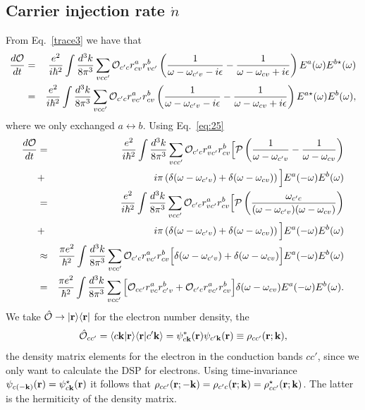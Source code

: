 \documentclass[floatfix,prb,aps,superscriptaddress,11pt]{revtex4}
\begin{document}
\subsection{Carrier injection rate $\dot n$}\label{sec:cir}
From Eq.~\eqref{trace3} we have that
\begin{eqnarray}\label{trace42}
\frac{d{\cal O}}{dt}
&=&
\frac{e^2}{i\hbar^2}
\int\frac{d^3k}{8\pi^3}
\sum_{vcc'}
{\cal O}_{c'c}r^a_{cv}r^b_{vc'}
\left(
\frac{1}{\omega-\omega_{c'v}-i\epsilon}
-
\frac{1}
{\omega-\omega_{cv}+i\epsilon}
\right)
E^a(\omega)E^{b\star}(\omega)
\\ \nonumber
&=&
\frac{e^2}{i\hbar^2}
\int\frac{d^3k}{8\pi^3}
\sum_{vcc'}
{\cal O}_{c'c}r^a_{vc'} r^b_{cv}
\left(
\frac{1}{\omega-\omega_{c'v}-i\epsilon}
-
\frac{1}
{\omega-\omega_{cv}+i\epsilon}
\right) 
E^{a\star}(\omega) E^b(\omega)
,
\end{eqnarray}  
where we only exchanged $a\leftrightarrow b$. Using Eq.~\eqref{eq:25}
\begin{eqnarray}\label{trace54}
\frac{d{\cal O}}{dt}
&=&
\frac{e^2}{i\hbar^2}
\int\frac{d^3k}{8\pi^3}
\sum_{vcc'}
{\cal O}_{c'c}r^a_{vc'} r^b_{cv}
\Big[
{\cal P}\left(
\frac{1}{\omega-\omega_{c'v}}
-
\frac{1}
{\omega-\omega_{cv}}
\right) 
\nonumber\\
&+&
i\pi\left(
\delta(\omega-\omega_{c'v})
+
\delta(\omega-\omega_{cv})
\right)
\Big]
E^a(-\omega) E^b(\omega)
\nonumber\\
&=&
\frac{e^2}{i\hbar^2}
\int\frac{d^3k}{8\pi^3}
\sum_{vcc'}
{\cal O}_{c'c}r^a_{vc'} r^b_{cv}
\Big[
{\cal P}\left(
\frac{\omega_{c'c}}{(\omega-\omega_{c'v})
(\omega-\omega_{cv})}
\right) 
\nonumber\\
&+&
i\pi\left(
\delta(\omega-\omega_{c'v})
+
\delta(\omega-\omega_{cv})
\right)
\Big]
E^a(-\omega) E^b(\omega)
\nonumber\\
&\approx&
\frac{\pi e^2}{\hbar^2}
\int\frac{d^3k}{8\pi^3}
\sum_{vcc'}
{\cal O}_{c'c}r^a_{vc'} r^b_{cv}
\Big[
\delta(\omega-\omega_{c'v})
+
\delta(\omega-\omega_{cv})
\Big]
E^a(-\omega) E^b(\omega)
\nonumber\\
&=&
\frac{\pi e^2}{\hbar^2}
\int\frac{d^3k}{8\pi^3}
\sum_{vcc'}
\Big[
{\cal O}_{cc'}r^a_{vc} r^b_{c'v}
+
{\cal O}_{c'c}r^a_{vc'} r^b_{cv}
\Big]
\delta(\omega-\omega_{cv}) 
E^a(-\omega) E^b(\omega) 
.
\end{eqnarray}  
We take $\hat{\cal O}\to|\mathbf{r}\rangle\langle\mathbf{r}|$
 for the electron
number density, the
\begin{equation}\label{rho}
\hat{\cal O}_{cc'}=\langle c\mathbf{k}|\mathbf{r}\rangle\langle\mathbf{r}|c'\mathbf{k}\rangle
=\psi_{c\mathbf{k}}^*(\mathbf{r}) \psi_{c'\mathbf{k}}(\mathbf{r})
\equiv\rho_{cc'}(\mathbf{r};\mathbf{k})
,
\end{equation}
the density matrix elements for the electron in the conduction bands $cc'$,
since we only want to calculate the DSP for electrons. 
Using time-invariance $\psi_{c(-\mathbf{k})}(\mathbf{r})=\psi_{c\mathbf{k}}^\star(\mathbf{r})$
it follows that
$\rho_{cc'}(\mathbf{r};-\mathbf{k})=\rho_{c'c}(\mathbf{r};\mathbf{k})=\rho_{cc'}^\star(\mathbf{r};\mathbf{k})$. The
latter is the hermiticity of the density matrix.
\end{document}
